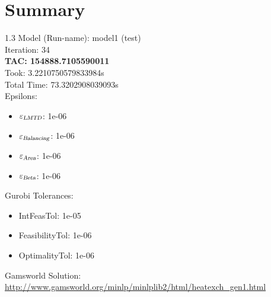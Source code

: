 \documentclass{article}%
\begin{document}
%
\normalsize%
\section{Summary}%
\thispagestyle{plain}%
\begin{spacing}{1.3}%
\Large%
Model (Run-name): model1 (test)\\%
Iteration: 34\\%
\textbf{TAC: 154888.7105590011}\\%
Took: 3.2210750579833984s\\%
Total Time: 73.3202908039093s\\%
Epsilons:%
\begin{itemize}%
	\item $\varepsilon_{\textsl{LMTD}}$: 1e-06%
	\item $\varepsilon_{\textsl{Balancing}}$: 1e-06%
	\item $\varepsilon_{\textsl{Area}}$: 1e-06%
	\item $\varepsilon_{\textsl{Beta}}$: 1e-06%
\end{itemize}%
Gurobi Tolerances:%
\begin{itemize}%
	\item IntFeasTol: 1e-05%
	\item FeasibilityTol: 1e-06%
	\item OptimalityTol: 1e-06%
\end{itemize}%
\end{spacing}%
\normalsize%
Gamsworld Solution: \url{http://www.gamsworld.org/minlp/minlplib2/html/heatexch_gen1.html}%
%
\clearpage%
\end{document}

